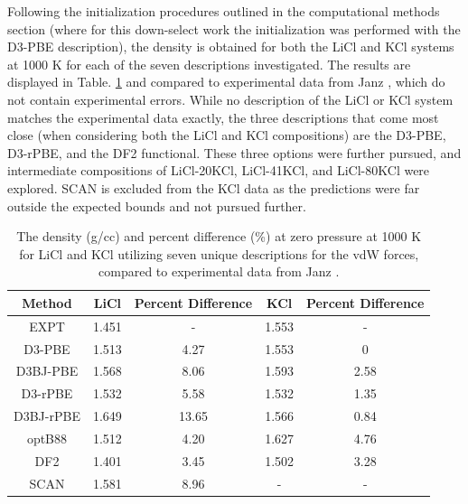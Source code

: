 \documentclass[review]{elsarticle}
\begin{document}
Following the initialization procedures outlined in the computational methods section (where for this down-select work the initialization was performed with the D3-PBE description), the density is obtained for both the LiCl and KCl systems at 1000 K for each of the seven descriptions investigated. The results are displayed in Table. \ref{tab:my_label} and compared to experimental data from Janz \cite{janz1975molten,van1955electrical}, which do not contain experimental errors. While no description of the LiCl or KCl system matches the experimental data exactly, the three descriptions that come most close (when considering both the LiCl and KCl compositions) are the D3-PBE, D3-rPBE, and the DF2 functional. These three options were further pursued, and intermediate compositions of LiCl-20KCl, LiCl-41KCl, and LiCl-80KCl were explored. SCAN is excluded from the KCl data as the predictions were far outside the expected bounds and not pursued further.
 

\begin{table}[]
    \centering
    \begin{tabular}{|c|c|c|c|c|}
\hline
Method	&	LiCl	& Percent Difference &	KCl & Percent Difference	\\
\hline
EXPT	&	1.451	& -&	1.553 &-	\\
D3-PBE	&	1.513	& 4.27&	1.553 & 0	\\
D3BJ-PBE	&	1.568 &	8.06&	1.593 & 2.58	\\
D3-rPBE	&	1.532	& 5.58&	1.532 & 1.35	\\
D3BJ-rPBE	&	1.649 &	13.65&	1.566 & 0.84	\\
optB88	&	1.512	& 4.20&	1.627 & 4.76	\\
DF2	&	1.401	& 3.45&	1.502 & 3.28	\\
SCAN & 1.581 & 8.96& -&- \\
\hline
    \end{tabular}
    \caption{The density (g/cc) and percent difference (\%) at zero pressure at 1000 K for LiCl and KCl utilizing seven unique descriptions for the vdW forces, compared to experimental data from Janz \cite{janz1975molten,van1955electrical}. }
    \label{tab:my_label}
\end{table}
\end{document}
